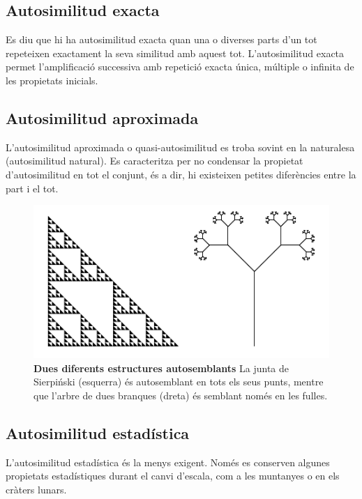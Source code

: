 \documentclass[12pt,a4paper]{report}
\begin{document}
\subsection{Autosimilitud exacta}
Es diu que hi ha autosimilitud exacta quan una o diverses parts d'un tot repeteixen exactament la seva similitud amb aquest tot. L'autosimilitud exacta permet l'amplificació successiva amb repetició exacta única, múltiple o infinita de les propietats inicials. %
\subsection{Autosimilitud aproximada}
L'autosimilitud aproximada o quasi-autosimilitud es troba sovint en la naturalesa (autosimilitud natural). Es caracteritza per no condensar la propietat d'autosimilitud en  tot el conjunt, és a dir, hi existeixen petites diferències entre la part i el tot.
\begin{figure}[!ht]
\centering
\includegraphics[scale=1]{img/img02_02_TreeSierpinski.pdf}
\caption{\textbf{Dues diferents estructures autosemblants} La junta de Sierpiński (esquerra) és autosemblant en tots els seus punts, mentre que l'arbre de dues branques (dreta) és semblant només en les fulles.}
\end{figure}
\subsection{Autosimilitud estadística}
L'autosimilitud estadística és la menys exigent. Només es conserven algunes propietats estadístiques durant el canvi d'escala, com a les muntanyes o en els cràters lunars.
\end{document}
